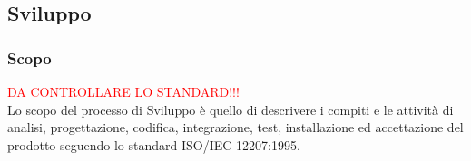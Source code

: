 \subsection{Sviluppo}
\subsubsection{Scopo}\textcolor{red}{DA CONTROLLARE LO STANDARD!!!}\\
Lo scopo del processo di Sviluppo è quello di descrivere i compiti e le attività di analisi, progettazione, codifica, integrazione, test, installazione ed accettazione del prodotto seguendo lo standard ISO/IEC 12207:1995.
